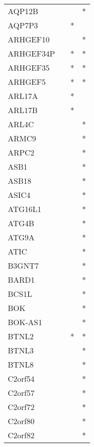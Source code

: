 \begin{longtable}{lccc}
AQP12B         &           &     &       * \\
AQP7P3         &           &   * &         \\
ARHGEF10       &           &     &       * \\
ARHGEF34P      &           &   * &       * \\
ARHGEF35       &           &   * &       * \\
ARHGEF5        &           &   * &       * \\
ARL17A         &           &   * &         \\
ARL17B         &           &   * &         \\
ARL4C          &           &     &       * \\
ARMC9          &           &     &       * \\
ARPC2          &           &     &       * \\
ASB1           &           &     &       * \\
ASB18          &           &     &       * \\
ASIC4          &           &     &       * \\
ATG16L1        &           &     &       * \\
ATG4B          &           &     &       * \\
ATG9A          &           &     &       * \\
ATIC           &           &     &       * \\
B3GNT7         &           &     &       * \\
BARD1          &           &     &       * \\
BCS1L          &           &     &       * \\
BOK            &           &     &       * \\
BOK-AS1        &           &     &       * \\
BTNL2          &           &   * &       * \\
BTNL3          &           &     &       * \\
BTNL8          &           &     &       * \\
C2orf54        &           &     &       * \\
C2orf57        &           &     &       * \\
C2orf72        &           &     &       * \\
C2orf80        &           &     &       * \\
C2orf82        &           &     &       * \\

\end{longtable}
